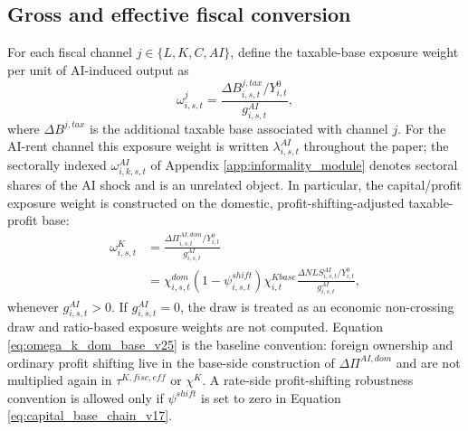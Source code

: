 \documentclass[11pt,a4paper]{article}
\begin{document}
\subsection{Gross and effective fiscal conversion}\label{subsec:gross_effective_fiscal_conversion}

For each fiscal channel $j\in\{L,K,C,AI\}$, define the taxable-base exposure weight per unit of AI-induced output as
\begin{equation}
    \omega^j_{i,s,t}
    =\frac{\Delta B^{j,tax}_{i,s,t}/Y^0_{i,t}}{g^{AI}_{i,s,t}},
\end{equation}
where $\Delta B^{j,tax}$ is the additional taxable base associated with channel $j$. For the AI-rent channel this exposure weight is written $\lambda^{AI}_{i,s,t}$ throughout the paper; the sectorally indexed $\omega^{AI}_{i,k,s,t}$ of Appendix \ref{app:informality_module} denotes sectoral shares of the AI shock and is an unrelated object. In particular, the capital/profit exposure weight is constructed on the domestic, profit-shifting-adjusted taxable-profit base:
\begin{equation}\label{eq:omega_k_dom_base_v25}
\begin{split}
    \omega^K_{i,s,t}
    &=\frac{\Delta\Pi^{AI,dom}_{i,s,t}/Y^0_{i,t}}{g^{AI}_{i,s,t}} \\
    &=\chi^{dom}_{i,s,t}(1-\psi^{shift}_{i,s,t})\chi^{Kbase}_{i,t}
      \frac{\Delta NLS^{AI}_{i,s,t}/Y^0_{i,t}}{g^{AI}_{i,s,t}},
\end{split}
\end{equation}
whenever $g^{AI}_{i,s,t}>0$. If $g^{AI}_{i,s,t}=0$, the draw is treated as an economic non-crossing draw and ratio-based exposure weights are not computed. Equation \eqref{eq:omega_k_dom_base_v25} is the baseline convention: foreign ownership and ordinary profit shifting live in the base-side construction of $\Delta\Pi^{AI,dom}$ and are not multiplied again in $\tau^{K,fisc,eff}$ or $\chi^K$. A rate-side profit-shifting robustness convention is allowed only if $\psi^{shift}$ is set to zero in Equation \eqref{eq:capital_base_chain_v17}.
\end{document}
